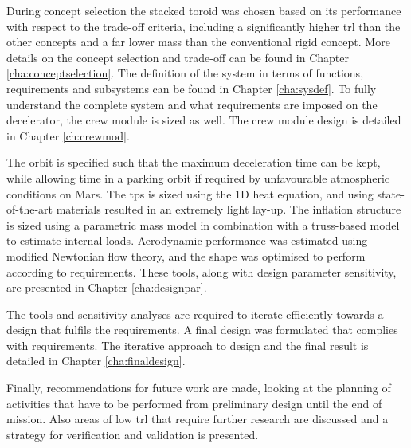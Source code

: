 During concept selection the stacked toroid was chosen based on its performance with respect to the trade-off criteria, including a significantly higher \gls{trl} than the other concepts and a far lower mass than the conventional rigid concept. More details on the concept selection and trade-off can be found in Chapter \ref{cha:conceptselection}. The definition of the system in terms of functions, requirements and subsystems can be found in Chapter \ref{cha:sysdef}. To fully understand the complete system and what requirements are imposed on the decelerator, the crew module is sized as well. The crew module design is detailed in Chapter \ref{ch:crewmod}.

The orbit is specified such that the maximum deceleration time can be kept, while allowing time in a parking orbit if required by unfavourable atmospheric conditions on Mars. The \gls{tps} is sized using the 1D heat equation, and using state-of-the-art materials resulted in an extremely light lay-up. The inflation structure is sized using a parametric mass model in combination with a truss-based model to estimate internal loads. Aerodynamic performance was estimated using modified Newtonian flow theory, and the shape was optimised to perform according to requirements. These tools, along with design parameter sensitivity, are presented in Chapter \ref{cha:designpar}.

The tools and sensitivity analyses are required to iterate efficiently towards a design that fulfils the requirements. A final design was formulated that complies with requirements. The iterative approach to design and the final result is detailed in Chapter \ref{cha:finaldesign}.

Finally, recommendations for future work are made, looking at the planning of activities that have to be performed from preliminary design until the end of mission. Also areas of low \gls{trl} that require further research are discussed and a strategy for verification and validation is presented.



